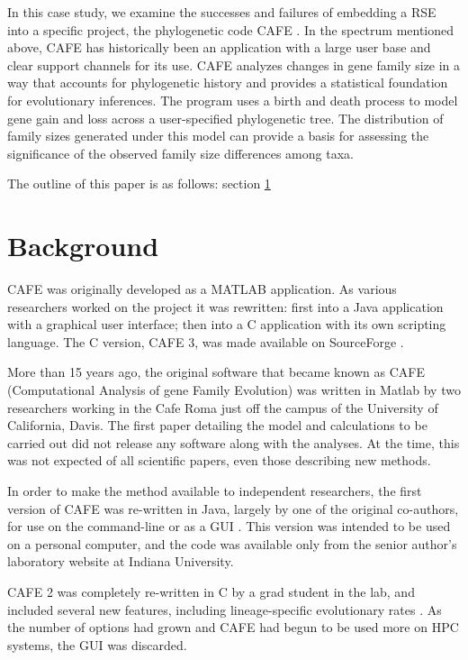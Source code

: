 \documentclass[acmtog, authorversion]{acmart}
\begin{document}
In this case study, we examine the successes and failures of embedding a RSE into a specific project, the phylogenetic code CAFE \cite{Hahn2005}. In the spectrum mentioned above, CAFE has historically been an application with a large user base and clear support channels for its use. CAFE analyzes changes in gene family size in a way that accounts for phylogenetic history and provides a statistical foundation for evolutionary inferences. The program uses a birth and death process to model gene gain and loss across a user-specified phylogenetic tree. The distribution of family sizes generated under this model can provide a basis for assessing the significance of the observed family size differences among taxa.

The outline of this paper is as follows: section \ref{sec:background}

\section{Background} \label{sec:background}
CAFE was originally developed as a MATLAB application. As various researchers worked on the project it was rewritten: first into a Java application with a graphical user interface; then into a C application with its own scripting language. The C version, CAFE 3, was made available on SourceForge \cite{SourceForge}. 

More than 15 years ago, the original software that became known as CAFE (Computational Analysis of gene Family Evolution) was written in Matlab by two researchers working in the Cafe Roma just off the campus of the University of California, Davis. The first paper \cite{Hahn2005} detailing the model and calculations to be carried out did not release any software along with the analyses. At the time, this was not expected of all scientific papers, even those describing new methods.

In order to make the method available to independent researchers, the first version of CAFE was re-written in Java, largely by one of the original co-authors, for use on the command-line or as a GUI \cite{DeBie2006}. This version was intended to be used on a personal computer, and the code was available only from the senior author’s laboratory website at Indiana University.

CAFE 2 was completely re-written in C by a grad student in the lab, and included several new features, including lineage-specific evolutionary rates \cite{hahn2007gene}. As the number of options had grown and CAFE had begun to be used more on HPC systems, the GUI was discarded.
\end{document}
